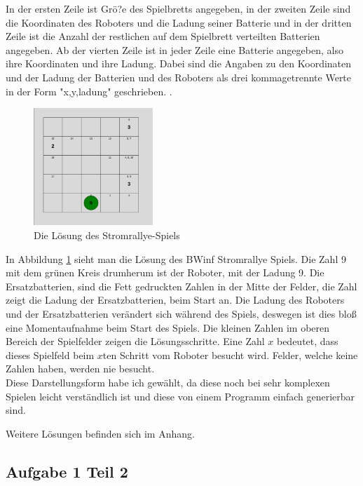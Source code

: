 \documentclass[a4paper,12pt,arial]{scrartcl}
\begin{document}
In der ersten Zeile ist Grö?e des Spielbretts angegeben, in der zweiten Zeile sind die Koordinaten des Roboters und die Ladung seiner Batterie und in der dritten Zeile ist die Anzahl der restlichen auf dem Spielbrett verteilten Batterien angegeben.
Ab der vierten Zeile ist in jeder Zeile eine Batterie angegeben, also ihre Koordinaten und ihre Ladung.
Dabei sind die Angaben zu den Koordinaten und der Ladung der Batterien und des Roboters als drei kommagetrennte Werte in der Form "x,y,ladung" geschrieben.
\textcite{bwinfMaterial}.

\begin{figure}    
    \includegraphics[width=0.4\textwidth]{Solution.pdf}
    \caption{Die Lösung des Stromrallye-Spiels}
    \label{fig:loesung1} 
\end{figure}

In Abbildung \ref{fig:loesung1} sieht man die Lösung des BWinf Stromrallye Spiels. Die Zahl 9 mit dem grünen Kreis drumherum ist der Roboter, mit der Ladung 9.
Die Ersatzbatterien, sind die Fett gedruckten Zahlen in der Mitte der Felder, die Zahl zeigt die Ladung der Ersatzbatterien, beim Start an.
Die Ladung des Roboters und der Ersatzbatterien verändert sich während des Spiels, deswegen ist dies bloß eine Momentaufnahme beim Start des Spiels.
Die kleinen Zahlen im oberen Bereich der Spielfelder zeigen die Lösungsschritte.
Eine Zahl $x$ bedeutet, dass dieses Spielfeld beim $x$ten Schritt vom Roboter besucht wird.
Felder, welche keine Zahlen haben, werden nie besucht.
\\
Diese Darstellungsform habe ich gewählt, da diese noch bei sehr komplexen Spielen leicht verständlich ist und diese von einem Programm einfach generierbar sind.
\par
Weitere Lösungen befinden sich im Anhang.

\subsection{Aufgabe 1 Teil 2}
\end{document}
